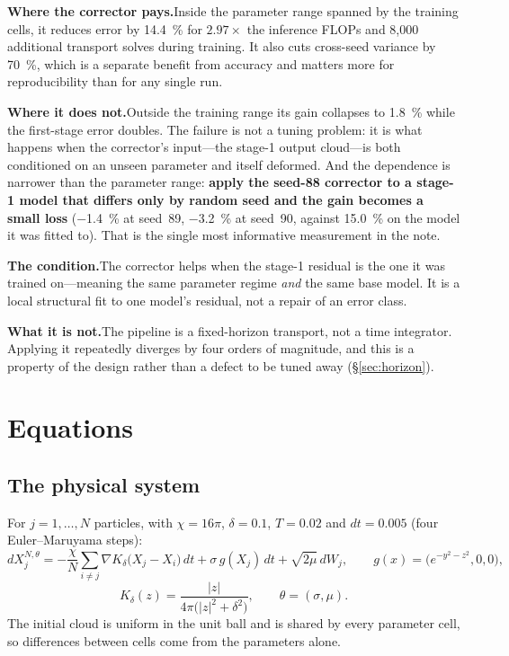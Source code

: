 ﻿\documentclass[11pt,a4paper]{article}
\begin{document}
\textbf{Where the corrector pays.}\hspace{0.4em}Inside the parameter range spanned by the training
cells, it reduces error by \SI{14.4}{\percent} for $2.97\times$ the inference FLOPs and 8{,}000
additional transport solves during training. It also cuts cross-seed variance by
\SI{70}{\percent}, which is a separate benefit from accuracy and matters more for reproducibility
than for any single run.

\textbf{Where it does not.}\hspace{0.4em}Outside the training range its gain collapses to
\SI{1.8}{\percent} while the first-stage error doubles. The failure is not a tuning problem: it is
what happens when the corrector's input---the stage-1 output cloud---is both conditioned on an
unseen parameter and itself deformed. And the dependence is narrower than the parameter range:
\textbf{apply the seed-88 corrector to a stage-1 model that differs only by random seed and the gain
becomes a small loss} (\SI{-1.4}{\percent} at seed~89, \SI{-3.2}{\percent} at seed~90, against
\SI{15.0}{\percent} on the model it was fitted to). That is the single most informative measurement
in the note.

\textbf{The condition.}\hspace{0.4em}The corrector helps when the stage-1 residual is the one it was
trained on---meaning the same parameter regime \emph{and} the same base model. It is a local
structural fit to one model's residual, not a repair of an error class.

\textbf{What it is not.}\hspace{0.4em}The pipeline is a fixed-horizon transport, not a time
integrator. Applying it repeatedly diverges by four orders of magnitude, and this is a property of
the design rather than a defect to be tuned away (\S\ref{sec:horizon}).

\section{Equations}

\subsection{The physical system}

For $j=1,\dots,N$ particles, with $\chi=16\pi$, $\delta=0.1$, $T=0.02$ and $dt=0.005$ (four
Euler--Maruyama steps):
\begin{equation}
dX_j^{N,\theta}
=-\frac{\chi}{N}\sum_{i\neq j}\nabla K_\delta\big(X_j-X_i\big)\,dt
+\sigma\,g(X_j)\,dt+\sqrt{2\mu}\,dW_j,
\qquad
g(x)=\big(e^{-y^2-z^2},0,0\big),
\end{equation}
\begin{equation}
K_\delta(z)=\frac{|z|}{4\pi\big(|z|^2+\delta^2\big)},
\qquad \theta=(\sigma,\mu).
\label{eq:sde}
\end{equation}
The initial cloud is uniform in the unit ball and is shared by every parameter cell, so differences
between cells come from the parameters alone.
\end{document}
